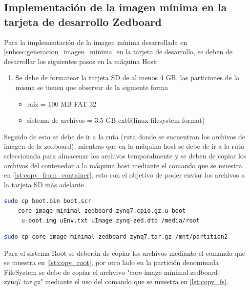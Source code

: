 \subsection{Implementación de la imagen mínima en la tarjeta de desarrollo Zedboard}

Para la implementación de la imagen mínima desarrollada en \ref{subsec:generacion_imagen_minima} en la tarjeta de desarrollo, se deben de desarrollar los siguientes pasos en la máquina Host:

\begin{enumerate}
    \item Se debe de formatear la tarjeta SD de al menos 4 GB, las particiones de la misma se tienen que observar de la siguiente forma 
    \begin{itemize}
        \item raíz = 100 MB FAT 32
        \item sistema de archivos = 3.5 GB ext6(linux filesystem format)
        \end{itemize} 
\end{enumerate}

Seguido de esto se debe de ir a la ruta (ruta donde se encuentran los archivos de imagen de la zedboard), mientras que en la máquina host se debe de ir a la ruta seleccionada para almacenar los archivos temporalmente y se deben de copiar los archivos del contenedor a la máquina host mediante el comando que se muestra en \ref{lst:copy_from_container}, esto con el objetivo de poder enviar los archivos a la tarjeta SD más adelante.

\begin{lstlisting}[language=bash, caption={Copiar archivos root, Linux}, label=lst:copy_root]
    sudo cp boot.bin boot.scr 
    core-image-minimal-zedboard-zynq7.cpio.gz.u-boot
     u-boot.img uEnv.txt uImage zynq-zed.dtb /media/root
\end{lstlisting}

\begin{lstlisting}[language=bash, caption={Copiar sistema de archivos, Linux}, label=lst:copy_fs]
    sudo cp core-image-minimal-zedboard-zynq7.tar.gz /mnt/partition2
\end{lstlisting}

Para el sistema Root se deberán de copiar los archivos mediante el comando que se muestra en \ref{lst:copy_root}, por otro lado en la partición denominada FileSystem se debe de copiar el archvivo "core-image-minimal-zedboard-zynq7.tar.gz" mediante el uso del comando que se muestra en \ref{lst:copy_fs}.

